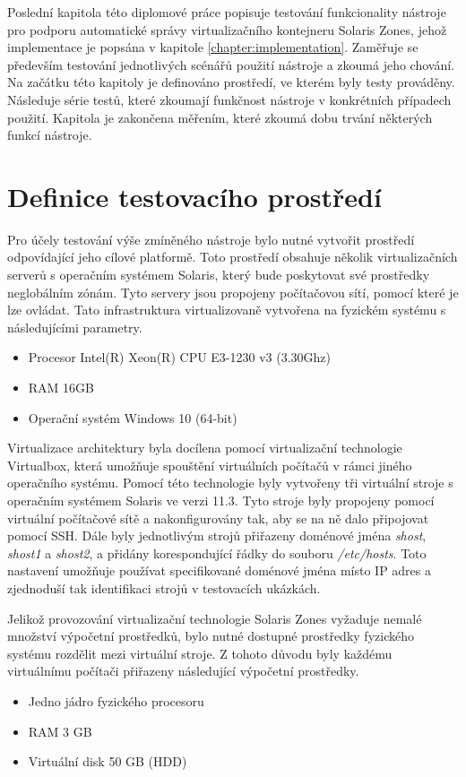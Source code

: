 \label{chapter:testing}
Poslední kapitola této diplomové práce popisuje testování funkcionality nástroje pro podporu automatické správy virtualizačního
kontejneru Solaris Zones, jehož implementace je popsána v kapitole \ref{chapter:implementation}. Zaměřuje se především testování
jednotlivých scénářů použití nástroje a zkoumá jeho chování. Na začátku této kapitoly je definováno prostředí, ve kterém byly
testy prováděny. Následuje série testů, které zkoumají funkčnost nástroje v konkrétních případech použití. Kapitola je zakončena
měřením, které zkoumá dobu trvání některých funkcí nástroje.
\section{Definice testovacího prostředí}
\label{chapter:testing}
Pro účely testování výše zmíněného nástroje bylo nutné vytvořit prostředí odpovídající jeho cílové platformě. Toto prostředí
obsahuje několik virtualizačních serverů s operačním systémem Solaris, který bude poskytovat své prostředky neglobálním zónám.
Tyto servery jsou propojeny počítačovou sítí, pomocí které je lze ovládat. Tato infrastruktura virtualizovaně vytvořena na 
fyzickém systému s následujícími parametry.
\begin{itemize}
 \item Procesor Intel(R) Xeon(R) CPU E3-1230 v3 (3.30Ghz)
 \item RAM 16GB
 \item Operační systém Windows 10 (64-bit)
\end{itemize}
Virtualizace architektury byla docílena pomocí virtualizační technologie Virtualbox, která umožňuje spouštění virtuálních 
počítačů v rámci jiného operačního systému. Pomocí této technologie byly vytvořeny tři virtuální stroje s operačním systémem
Solaris ve verzi 11.3. Tyto stroje byly propojeny pomocí virtuální počítačové sítě a nakonfigurovány tak, aby se na ně dalo 
připojovat pomocí SSH. Dále byly jednotlivým strojů přiřazeny doménové jména \textit{shost}, \textit{shost1} a \textit{shost2},
a přidány korespondující řádky do souboru \textit{/etc/hosts}. Toto nastavení umožňuje používat specifikované doménové jména
místo IP adres a zjednoduší tak identifikaci strojů v testovacích ukázkách. 

Jelikož provozování virtualizační technologie Solaris Zones vyžaduje nemalé množství výpočetní prostředků, bylo nutné
dostupné prostředky fyzického systému rozdělit mezi virtuální stroje. Z tohoto důvodu byly každému virtuálnímu počítači
přiřazeny následující výpočetní prostředky.
\begin{itemize}
 \item Jedno jádro fyzického procesoru
 \item RAM 3 GB 
 \item Virtuální disk 50 GB (HDD)
\end{itemize}

